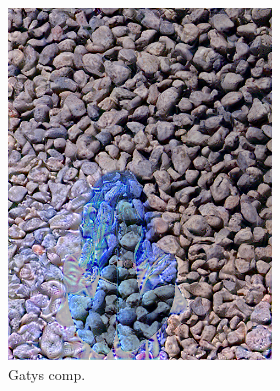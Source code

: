 \begin{figure}[]
\begin{subfigure}{\textwidth}
\begin{subfigure}{0.24\textwidth}
            \includegraphics[width=\textwidth]{images/04-experiment02/human/pebbles/gatys_im.jpg}
            \caption*{Gatys comp.}
        \end{subfigure}
        \hfill
        \begin{subfigure}{0.24\textwidth}
            \centering

\end{subfigure}
\end{subfigure}
\end{figure}
